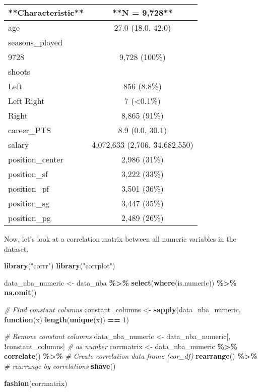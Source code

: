 \documentclass[
]{book}
\newenvironment{Shaded}{\begin{snugshade}}{\end{snugshade}}
\newcommand{\CommentTok}[1]{\textcolor[rgb]{0.56,0.35,0.01}{\textit{#1}}}
\newcommand{\ControlFlowTok}[1]{\textcolor[rgb]{0.13,0.29,0.53}{\textbf{#1}}}
\newcommand{\DecValTok}[1]{\textcolor[rgb]{0.00,0.00,0.81}{#1}}
\newcommand{\FunctionTok}[1]{\textcolor[rgb]{0.13,0.29,0.53}{\textbf{#1}}}
\newcommand{\NormalTok}[1]{#1}
\newcommand{\OtherTok}[1]{\textcolor[rgb]{0.56,0.35,0.01}{#1}}
\newcommand{\SpecialCharTok}[1]{\textcolor[rgb]{0.81,0.36,0.00}{\textbf{#1}}}
\newcommand{\StringTok}[1]{\textcolor[rgb]{0.31,0.60,0.02}{#1}}
\begin{document}
\begin{tabular}{l|c}
\hline
**Characteristic** & **N = 9,728**\\
\hline
age & 27.0 (18.0, 42.0)\\
\hline
seasons\_played & \\
\hline
9728 & 9,728 (100\%)\\
\hline
shoots & \\
\hline
Left & 856 (8.8\%)\\
\hline
Left Right & 7 (<0.1\%)\\
\hline
Right & 8,865 (91\%)\\
\hline
career\_PTS & 8.9 (0.0, 30.1)\\
\hline
salary & 4,072,633 (2,706, 34,682,550)\\
\hline
position\_center & 2,986 (31\%)\\
\hline
position\_sf & 3,222 (33\%)\\
\hline
position\_pf & 3,501 (36\%)\\
\hline
position\_sg & 3,447 (35\%)\\
\hline
position\_pg & 2,489 (26\%)\\
\hline
\end{tabular}

Now, let's look at a correlation matrix between all numeric
variables in the dataset.

\begin{Shaded}
\begin{Highlighting}[]
\FunctionTok{library}\NormalTok{(}\StringTok{"corrr"}\NormalTok{)}
\FunctionTok{library}\NormalTok{(}\StringTok{"corrplot"}\NormalTok{)}

\NormalTok{data\_nba\_numeric }\OtherTok{\textless{}{-}}\NormalTok{ data\_nba }\SpecialCharTok{\%\textgreater{}\%}
  \FunctionTok{select}\NormalTok{(}\FunctionTok{where}\NormalTok{(is.numeric)) }\SpecialCharTok{\%\textgreater{}\%}
  \FunctionTok{na.omit}\NormalTok{()}

\CommentTok{\# Find constant columns}
\NormalTok{constant\_columns }\OtherTok{\textless{}{-}} \FunctionTok{sapply}\NormalTok{(data\_nba\_numeric, }\ControlFlowTok{function}\NormalTok{(x) }\FunctionTok{length}\NormalTok{(}\FunctionTok{unique}\NormalTok{(x)) }\SpecialCharTok{==} \DecValTok{1}\NormalTok{)}

\CommentTok{\# Remove constant columns}
\NormalTok{data\_nba\_numeric }\OtherTok{\textless{}{-}}\NormalTok{ data\_nba\_numeric[, }\SpecialCharTok{!}\NormalTok{constant\_columns]}
\CommentTok{\# as number}
\NormalTok{corrmatrix }\OtherTok{\textless{}{-}}\NormalTok{ data\_nba\_numeric }\SpecialCharTok{\%\textgreater{}\%}
  \FunctionTok{correlate}\NormalTok{() }\SpecialCharTok{\%\textgreater{}\%}    \CommentTok{\# Create correlation data frame (cor\_df)}
  \FunctionTok{rearrange}\NormalTok{() }\SpecialCharTok{\%\textgreater{}\%}  \CommentTok{\# rearrange by correlations}
  \FunctionTok{shave}\NormalTok{() }

\FunctionTok{fashion}\NormalTok{(corrmatrix)}
\end{Highlighting}
\end{Shaded}
\end{document}
